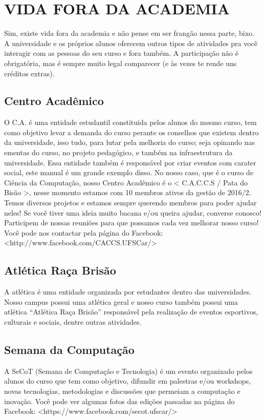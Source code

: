 \section{VIDA FORA DA ACADEMIA}
Sim, existe vida fora da academia e não pense em ser frangão nessa parte, bixo. A universidade e os próprios alunos oferecem outros tipos de atividades pra você interagir com as pessoas do seu curso e fora também. A participação não é obrigatória, mas é sempre muito legal comparecer (e às vezes te rende uns créditos extras).

\subsection{Centro Acadêmico}
O C.A. é uma entidade estudantil constituida pelos alunos do mesmo curso, tem como objetivo levar a demanda do curso perante os conselhos que existem dentro da universidade, isso tudo, para lutar pela melhoria do curso; seja opinando nas ementas do curso, no projeto pedagógico, e também na infraestrutura da universidade. Essa entidade também é responsável por criar eventos com carater social, este manual é um grande exemplo disso. No nosso caso, que é o curso de Ciência da Computação, nosso Centro Acadêmico é o < C.A.C.C.S / Pata do Bisão >, nesse momento estamos com 10 membros ativos da gestão de 2016/2. Temos diversos projetos e estamos sempre querendo membros para poder ajudar neles! Se você tiver uma ideia muito bacana e/ou queira ajudar, converse conosco! Participem de nossas reuniões para que possamos cada vez melhorar nosso curso! Você pode nos contactar pela página do Facebook: \newline <http://www.facebook.com/CACCS.UFSCar/>

\subsection{Atlética Raça Brisão}
A atlética é uma entidade organizada por estudantes dentro das universidades. Nosso campus possui uma atlética geral e nosso curso também possui uma atlética “Atlética Raça Brisão” responsável  pela   realização   de eventos esportivos, culturais  e  sociais, dentre outras atividades.

\subsection{Semana da Computação}
A SeCoT (Semana de Computação e Tecnologia) é um evento organizado pelos alunos do curso que tem como objetivo, difundir em palestras e/ou workshops, novas tecnologias, metodologias e discussões que permeiam a computação e inovação. Você pode ver algumas fotos das edições passadas na página do Facebook: \newline <https://www.facebook.com/secot.ufscar/>

